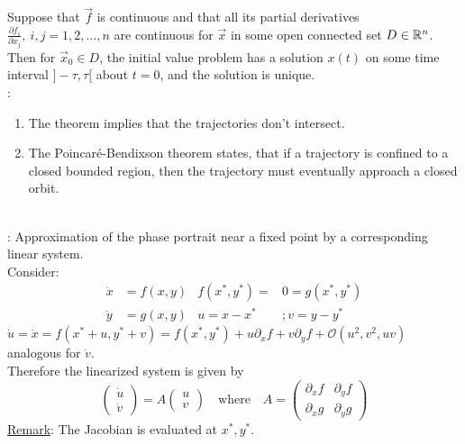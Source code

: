 Suppose that $\vec{f}$ is continuous and that all its partial derivatives $\frac{\partial f_i}{\partial x_j},\ i,j=1,2,\ldots,n$ are continuous for $\vec{x}$ in some open connected set $D\in\mathbb{R}^n$. Then for $\vec{x}_0\in D$, the initial value problem has a solution $x(t)$ on some time interval $]-\tau,\tau[$ about $t=0$, and the solution is unique.\\
\underline{}:
\begin{enumerate}[label={$\arabic*)$}]
	\item The theorem implies that the trajectories don't intersect.
	\item The Poincaré-Bendixson theorem states, that if a trajectory is confined to a closed bounded region, then the trajectory must eventually approach a closed orbit.
\end{enumerate}
\textbf{\underline{}}\vspace{0.2cm}\\
\underline{}: Approximation of the phase portrait near a fixed point by a corresponding linear system.\\
Consider:
\begin{align*}
	\dot{x}&=f(x,y) & f(x^\ast,y^\ast)=&0=g(x^\ast,y^\ast)\\
	\dot{y}&=g(x,y) & u=x-x^\ast&;v=y-y^\ast
\end{align*}
$\dot{u}=\dot{x}=f(x^\ast+u,y^\ast+v)=f(x^\ast,y^\ast)+u\partial_x f+v\partial_yf+\mathcal{O}\left(u^2,v^2,uv\right)$ analogous for $\dot{v}$.\\
Therefore the linearized system is given by
\begin{equation*}
	\begin{pmatrix} \dot{u} \\\dot{v}\end{pmatrix}=A\begin{pmatrix}u\\ v\end{pmatrix}\quad\text{where}\quad A=\begin{pmatrix}\partial_x f & \partial_y f\\\partial_x g& \partial_y g\end{pmatrix}
\end{equation*}
\underline{Remark}: The Jacobian is evaluated at $x^\ast,y^\ast$.
